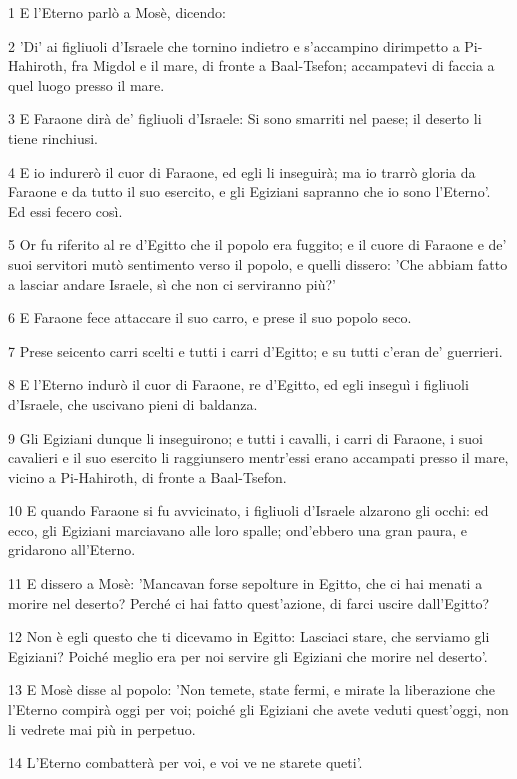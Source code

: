 \par 1 E l'Eterno parlò a Mosè, dicendo:
\par 2 'Di' ai figliuoli d'Israele che tornino indietro e s'accampino dirimpetto a Pi-Hahiroth, fra Migdol e il mare, di fronte a Baal-Tsefon; accampatevi di faccia a quel luogo presso il mare.
\par 3 E Faraone dirà de' figliuoli d'Israele: Si sono smarriti nel paese; il deserto li tiene rinchiusi.
\par 4 E io indurerò il cuor di Faraone, ed egli li inseguirà; ma io trarrò gloria da Faraone e da tutto il suo esercito, e gli Egiziani sapranno che io sono l'Eterno'. Ed essi fecero così.
\par 5 Or fu riferito al re d'Egitto che il popolo era fuggito; e il cuore di Faraone e de' suoi servitori mutò sentimento verso il popolo, e quelli dissero: 'Che abbiam fatto a lasciar andare Israele, sì che non ci serviranno più?'
\par 6 E Faraone fece attaccare il suo carro, e prese il suo popolo seco.
\par 7 Prese seicento carri scelti e tutti i carri d'Egitto; e su tutti c'eran de' guerrieri.
\par 8 E l'Eterno indurò il cuor di Faraone, re d'Egitto, ed egli inseguì i figliuoli d'Israele, che uscivano pieni di baldanza.
\par 9 Gli Egiziani dunque li inseguirono; e tutti i cavalli, i carri di Faraone, i suoi cavalieri e il suo esercito li raggiunsero mentr'essi erano accampati presso il mare, vicino a Pi-Hahiroth, di fronte a Baal-Tsefon.
\par 10 E quando Faraone si fu avvicinato, i figliuoli d'Israele alzarono gli occhi: ed ecco, gli Egiziani marciavano alle loro spalle; ond'ebbero una gran paura, e gridarono all'Eterno.
\par 11 E dissero a Mosè: 'Mancavan forse sepolture in Egitto, che ci hai menati a morire nel deserto? Perché ci hai fatto quest'azione, di farci uscire dall'Egitto?
\par 12 Non è egli questo che ti dicevamo in Egitto: Lasciaci stare, che serviamo gli Egiziani? Poiché meglio era per noi servire gli Egiziani che morire nel deserto'.
\par 13 E Mosè disse al popolo: 'Non temete, state fermi, e mirate la liberazione che l'Eterno compirà oggi per voi; poiché gli Egiziani che avete veduti quest'oggi, non li vedrete mai più in perpetuo.
\par 14 L'Eterno combatterà per voi, e voi ve ne starete queti'.
